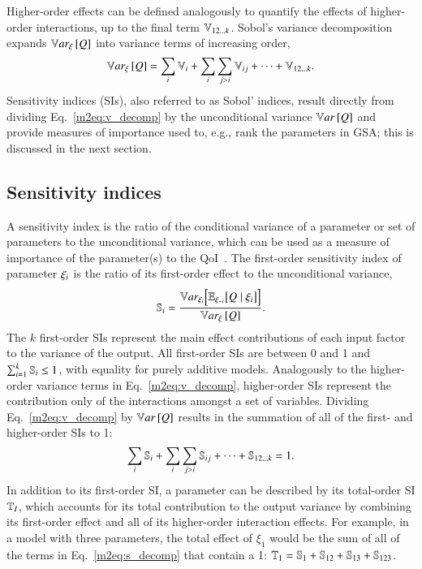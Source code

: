 Higher-order effects can be defined analogously to quantify the effects of higher-order interactions, up to the final term $\V{12 \ldots k}$.
Sobol's variance decomposition expands $\Vxi{Q}$ into variance terms of increasing order,
\begin{equation} \label{m2eq:v_decomp}
    \Vxi{Q} = \sum_i \V{i} + \sum_i \sum_{j > i} \V{ij} + \cdots + \V{12 \ldots k} .
\end{equation}
Sensitivity indices (SIs), also referred to as Sobol' indices, result directly from dividing Eq.~\eqref{m2eq:v_decomp} by the unconditional variance $\Var{Q}$ and provide measures of importance used to, e.g., rank the parameters in GSA; this is discussed in the next section.

\subsection{Sensitivity indices}
A sensitivity index is the ratio of the conditional variance of a parameter or set of parameters to the unconditional variance, which can be used as a measure of importance of the parameter(s) to the QoI~\cite{sobol-1993, homma-saltelli-1996, hora-iman-1986, ishigami-homma-1990, iman-hora-1990}.
The first-order sensitivity index of parameter $\xii$ is the ratio of its first-order effect to the unconditional variance,
\begin{equation} \label{m2eq:si}
    \S{i} = \frac{\VEi{Q \mid \xii}}{\Vxi{Q}} .
\end{equation}
The $k$ first-order SIs represent the main effect contributions of each input factor to the variance of the output.
All first-order SIs are between 0 and 1 and $\sum_{i=1}^k \S{i} \leq 1$, with equality for purely additive models.
Analogously to the higher-order variance terms in Eq.~\eqref{m2eq:v_decomp}, higher-order SIs represent the contribution only of the interactions amongst a set of variables. 
Dividing Eq.~\eqref{m2eq:v_decomp} by $\Var{Q}$ results in the summation of all of the first- and higher-order SIs to 1:
\begin{equation} \label{m2eq:s_decomp}
    \sum_i \S{i} + \sum_i \sum_{j > i} \S{ij} + \cdots + \S{12 \ldots k} = 1.
\end{equation}
In addition to its first-order SI, a parameter can be described by its total-order SI $\T{I}$, which accounts for its total contribution to the output variance by combining its first-order effect and all of its higher-order interaction effects.
For example, in a model with three parameters, the total effect of $\xi_1$ would be the sum of all of the terms in Eq.~\eqref{m2eq:s_decomp} that contain a 1: $\T{1} = \S{1} + \S{12} + \S{13} + \S{123}$. 
